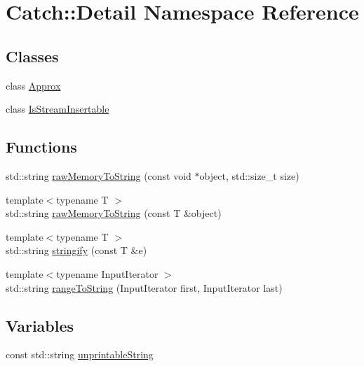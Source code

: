 \hypertarget{namespaceCatch_1_1Detail}{}\section{Catch\+:\+:Detail Namespace Reference}
\label{namespaceCatch_1_1Detail}
\subsection*{Classes}
\begin{DoxyCompactItemize}
\item 
class \mbox{\hyperlink{classCatch_1_1Detail_1_1Approx}{Approx}}
\item 
class \mbox{\hyperlink{classCatch_1_1Detail_1_1IsStreamInsertable}{Is\+Stream\+Insertable}}
\end{DoxyCompactItemize}
\subsection*{Functions}
\begin{DoxyCompactItemize}
\item 
std\+::string \mbox{\hyperlink{namespaceCatch_1_1Detail_ac5d6c510e565ee5bddcc2236194ce29e}{raw\+Memory\+To\+String}} (const void $\ast$object, std\+::size\+\_\+t size)
\item 
{\footnotesize template$<$typename T $>$ }\\std\+::string \mbox{\hyperlink{namespaceCatch_1_1Detail_a371620ed524abfcae5c3772bf49b563a}{raw\+Memory\+To\+String}} (const T \&object)
\item 
{\footnotesize template$<$typename T $>$ }\\std\+::string \mbox{\hyperlink{namespaceCatch_1_1Detail_af0ad48344ffd3f92f3568465248a9880}{stringify}} (const T \&e)
\item 
{\footnotesize template$<$typename Input\+Iterator $>$ }\\std\+::string \mbox{\hyperlink{namespaceCatch_1_1Detail_a6650a1dff325bf29962ff15ae73fd972}{range\+To\+String}} (Input\+Iterator first, Input\+Iterator last)
\end{DoxyCompactItemize}
\subsection*{Variables}
\begin{DoxyCompactItemize}
\item 
const std\+::string \mbox{\hyperlink{namespaceCatch_1_1Detail_a466775f4eec29ffef29ab334cd885136}{unprintable\+String}}
\end{DoxyCompactItemize}


